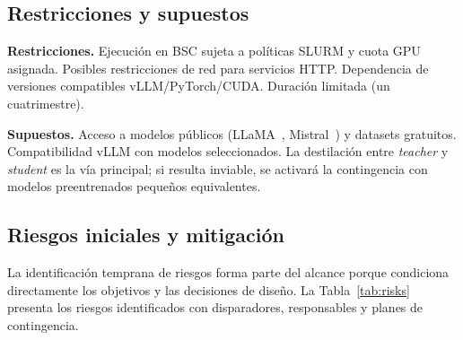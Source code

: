 \documentclass[11pt,a4paper]{article}
\begin{document}
\subsection{Restricciones y supuestos}

\textbf{Restricciones.} Ejecución en BSC sujeta a políticas SLURM y cuota GPU asignada. Posibles restricciones de red para servicios HTTP. Dependencia de versiones compatibles vLLM/PyTorch/CUDA. Duración limitada (un cuatrimestre).

\textbf{Supuestos.} Acceso a modelos públicos (LLaMA~\cite{touvron2023llama}, Mistral~\cite{jiang2023mistral}) y datasets gratuitos. Compatibilidad vLLM con modelos seleccionados. La destilación entre \textit{teacher} y \textit{student} es la vía principal; si resulta inviable, se activará la contingencia con modelos preentrenados pequeños equivalentes.

\subsection{Riesgos iniciales y mitigación}

La identificación temprana de riesgos forma parte del alcance porque condiciona directamente los objetivos y las decisiones de diseño. La Tabla~\ref{tab:risks} presenta los riesgos identificados con disparadores, responsables y planes de contingencia.
\end{document}
